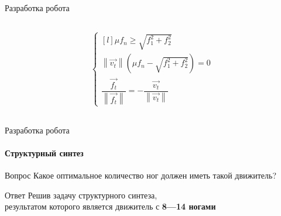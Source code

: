 \documentclass[aspectratio=169,xcolor=table]{beamer}
\begin{document}
\begin{frame}[t]{Разработка робота}
\begin{columns}[T,onlytextwidth]
\begin{column}{0.29\textwidth}
\begin{figure}[H]
                \label{fig:contact_interaction.png}
            \end{figure}
            \vspace{-1cm}
            \begin{align*}
                \left\{\begin{matrix*}[l]
                           \mu f_n \geqslant \sqrt{f_1^2 + f_2^2}\\
                           \left\lVert \vec{v_t}\right\rVert (\mu f_n - \sqrt{f_1^2 + f_2^2}) = 0\\
                           \dfrac{\vec{f_t}}{\left\lVert \vec{f_t}\right\rVert } = - \dfrac{\vec{v_t}}{\left\lVert \vec{v_t}\right\rVert }
                       \end{matrix*}\right.
            \end{align*}
        \end{column}
    \end{columns}
\end{frame}

\begin{frame}[t]{Разработка робота}
    \framesubtitle{Структурный синтез}
    {\large\begin{block}{Вопрос}
            Какое оптимальное количество ног должен иметь такой движитель?
        \end{block}}
    {\large\begin{alertblock}{Ответ}
            \centering Решив задачу структурного синтеза,\\ результатом которого является движитель с \textbf{8---14 ногами}
        \end{alertblock}}
\end{frame}
\end{document}
